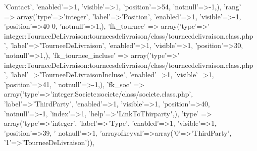 \begin{DoxyCode}
{      'Contact'}, \textcolor{stringliteral}{'enabled'}=>1, \textcolor{stringliteral}{'visible'}=>1, \textcolor{stringliteral}{'position'}=>54, \textcolor{stringliteral}{'notnull'}=>-1,),
        \textcolor{stringliteral}{'rang'} => array(\textcolor{stringliteral}{'type'}=>\textcolor{stringliteral}{'integer'}, \textcolor{stringliteral}{'label'}=>\textcolor{stringliteral}{'Position'}, \textcolor{stringliteral}{'enabled'}=>1, \textcolor{stringliteral}{'visible'}=>-1, \textcolor{stringliteral}{'position'}=>40
      0, \textcolor{stringliteral}{'notnull'}=>1,),
        \textcolor{stringliteral}{'fk\_tournee'} => array(\textcolor{stringliteral}{'type'}=>\textcolor{stringliteral}{'
      integer:TourneeDeLivraison:tourneesdelivraison/class/tourneedelivraison.class.php'}, \textcolor{stringliteral}{'label'}=>\textcolor{stringliteral}{'TourneeDeLivraison'}, \textcolor{stringliteral}{'enabled'}=>1, \textcolor{stringliteral}{'visible'}=>1, \textcolor{stringliteral}{'position'}=>30, \textcolor{stringliteral}{'notnull'}=>1,),
        \textcolor{stringliteral}{'fk\_tournee\_incluse'} => array(\textcolor{stringliteral}{'type'}=>\textcolor{stringliteral}{'
      integer:TourneeDeLivraison:tourneesdelivraison/class/tourneedelivraison.class.php'}, \textcolor{stringliteral}{'label'}=>\textcolor{stringliteral}{'TourneeDeLivraisonIncluse'}, \textcolor{stringliteral}{'enabled'}=>1, \textcolor{stringliteral}{'visible'}=>1, \textcolor{stringliteral}{'position'}=>41, \textcolor{stringliteral}{'
      notnull'}=>-1,),
        \textcolor{stringliteral}{'fk\_soc'} => array(\textcolor{stringliteral}{'type'}=>\textcolor{stringliteral}{'integer:Societe:societe/class/societe.class.php'}, \textcolor{stringliteral}{'label'}=>\textcolor{stringliteral}{'ThirdParty'},
       \textcolor{stringliteral}{'enabled'}=>1, \textcolor{stringliteral}{'visible'}=>1, \textcolor{stringliteral}{'position'}=>40, \textcolor{stringliteral}{'notnull'}=>-1, \textcolor{stringliteral}{'index'}=>1, \textcolor{stringliteral}{'help'}=>\textcolor{stringliteral}{"LinkToThirparty"},),
        \textcolor{stringliteral}{'type'} => array(\textcolor{stringliteral}{'type'}=>\textcolor{stringliteral}{'integer'}, \textcolor{stringliteral}{'label'}=>\textcolor{stringliteral}{'Type'}, \textcolor{stringliteral}{'enabled'}=>1, \textcolor{stringliteral}{'visible'}=>1, \textcolor{stringliteral}{'position'}=>39, \textcolor{stringliteral}{'
      notnull'}=>1, \textcolor{stringliteral}{'arrayofkeyval'}=>array(\textcolor{charliteral}{'0'}=>\textcolor{stringliteral}{'ThirdParty'}, \textcolor{charliteral}{'1'}=>\textcolor{stringliteral}{'TourneeDeLivraison'})),

\end{DoxyCode}
